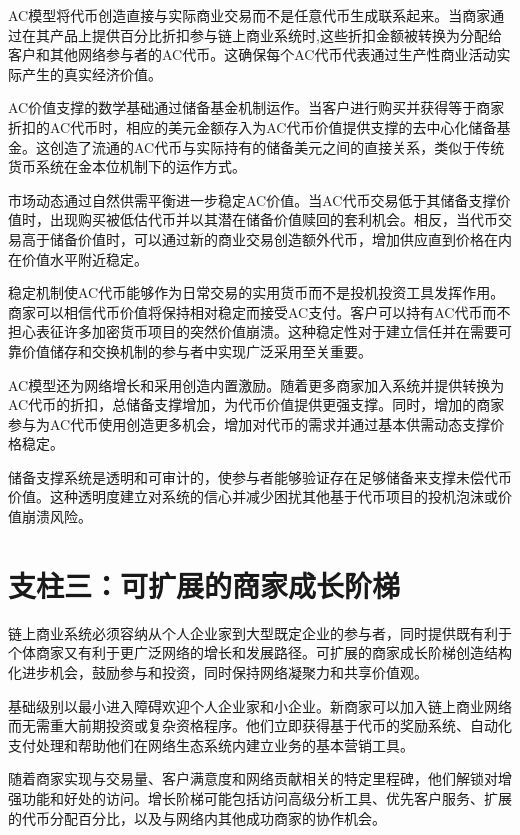 \documentclass[
  Letterpaper,
]{scrbook}
\begin{document}
AC模型将代币创造直接与实际商业交易而不是任意代币生成联系起来。当商家通过在其产品上提供百分比折扣参与链上商业系统时,这些折扣金额被转换为分配给客户和其他网络参与者的AC代币。这确保每个AC代币代表通过生产性商业活动实际产生的真实经济价值。

AC价值支撑的数学基础通过储备基金机制运作。当客户进行购买并获得等于商家折扣的AC代币时，相应的美元金额存入为AC代币价值提供支撑的去中心化储备基金。这创造了流通的AC代币与实际持有的储备美元之间的直接关系，类似于传统货币系统在金本位机制下的运作方式。

市场动态通过自然供需平衡进一步稳定AC价值。当AC代币交易低于其储备支撑价值时，出现购买被低估代币并以其潜在储备价值赎回的套利机会。相反，当代币交易高于储备价值时，可以通过新的商业交易创造额外代币，增加供应直到价格在内在价值水平附近稳定。

稳定机制使AC代币能够作为日常交易的实用货币而不是投机投资工具发挥作用。商家可以相信代币价值将保持相对稳定而接受AC支付。客户可以持有AC代币而不担心表征许多加密货币项目的突然价值崩溃。这种稳定性对于建立信任并在需要可靠价值储存和交换机制的参与者中实现广泛采用至关重要。

AC模型还为网络增长和采用创造内置激励。随着更多商家加入系统并提供转换为AC代币的折扣，总储备支撑增加，为代币价值提供更强支撑。同时，增加的商家参与为AC代币使用创造更多机会，增加对代币的需求并通过基本供需动态支撑价格稳定。

储备支撑系统是透明和可审计的，使参与者能够验证存在足够储备来支撑未偿代币价值。这种透明度建立对系统的信心并减少困扰其他基于代币项目的投机泡沫或价值崩溃风险。

\section{支柱三：可扩展的商家成长阶梯}\label{ux652fux67f1ux4e09ux53efux6269ux5c55ux7684ux5546ux5bb6ux6210ux957fux9636ux68af}

链上商业系统必须容纳从个人企业家到大型既定企业的参与者，同时提供既有利于个体商家又有利于更广泛网络的增长和发展路径。可扩展的商家成长阶梯创造结构化进步机会，鼓励参与和投资，同时保持网络凝聚力和共享价值观。

基础级别以最小进入障碍欢迎个人企业家和小企业。新商家可以加入链上商业网络而无需重大前期投资或复杂资格程序。他们立即获得基于代币的奖励系统、自动化支付处理和帮助他们在网络生态系统内建立业务的基本营销工具。

随着商家实现与交易量、客户满意度和网络贡献相关的特定里程碑，他们解锁对增强功能和好处的访问。增长阶梯可能包括访问高级分析工具、优先客户服务、扩展的代币分配百分比，以及与网络内其他成功商家的协作机会。
\end{document}
